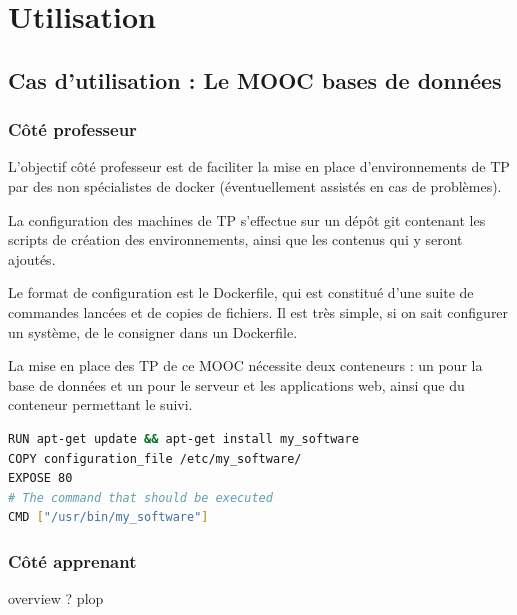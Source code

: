 \documentclass[a4paper,11pt]{report}
\begin{document}
\subsection{}

\subsection{}

\chapter{Utilisation}

\section{Cas d'utilisation : Le MOOC bases de données}

\subsection{Côté professeur}

L'objectif côté professeur est de faciliter la mise en place d'environnements de TP par des non spécialistes de docker (éventuellement assistés en cas de problèmes).

La configuration des machines de TP s'effectue sur un dépôt git contenant les scripts de création des environnements, ainsi que les contenus qui y seront ajoutés.

Le format de configuration est le Dockerfile, qui est constitué d'une suite de commandes lancées et de copies de fichiers. Il est très simple, si on sait configurer un système, de le consigner dans un Dockerfile.

La mise en place des TP de ce MOOC nécessite deux conteneurs : un pour la base de données et un pour le serveur et les applications web, ainsi que du conteneur permettant le suivi.

\begin{lstlisting}[language=Bash,caption={Dockerfile de base}]
RUN apt-get update && apt-get install my_software
COPY configuration_file /etc/my_software/
EXPOSE 80
# The command that should be executed
CMD ["/usr/bin/my_software"]
\end{lstlisting}


\subsection{Côté apprenant}

overview ?
plop\cite{AbedonHymanThomas2003}
\cite{website:fermentas-lambda}

\printbibliography
\end{document}
